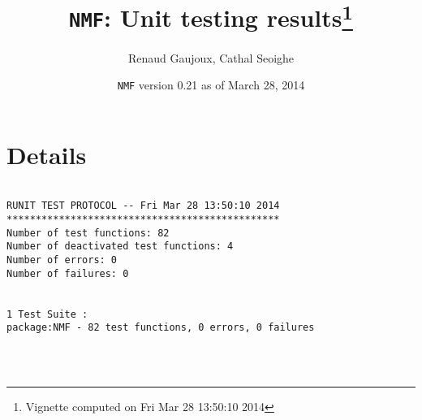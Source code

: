 \documentclass[10pt]{article}\usepackage[]{graphicx}\usepackage[]{color}
\author{Renaud Gaujoux, Cathal Seoighe}
\title{\texttt{NMF}: Unit testing results\footnote{Vignette computed  on Fri Mar 28 13:50:10 2014}}
\date{\texttt{NMF} version 0.21 as of March 28, 2014}
\begin{document}
\maketitle

\section{Details}
\begin{verbatim}

RUNIT TEST PROTOCOL -- Fri Mar 28 13:50:10 2014 
*********************************************** 
Number of test functions: 82 
Number of deactivated test functions: 4 
Number of errors: 0 
Number of failures: 0 

 
1 Test Suite : 
package:NMF - 82 test functions, 0 errors, 0 failures




\end{verbatim}
\end{document}
